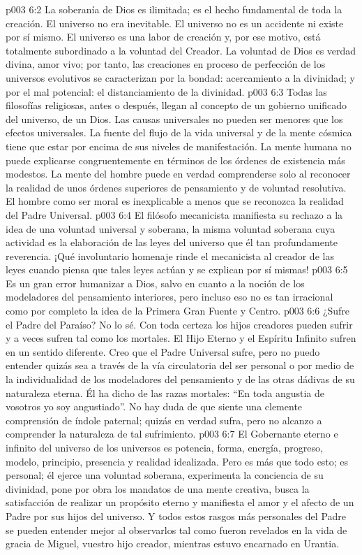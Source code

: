 \vs p003 6:2 La soberanía de Dios es ilimitada; es el hecho fundamental de toda la creación. El universo no era inevitable. El universo no es un accidente ni existe por sí mismo. El universo es una labor de creación y, por ese motivo, está totalmente subordinado a la voluntad del Creador. La voluntad de Dios es verdad divina, amor vivo; por tanto, las creaciones en proceso de perfección de los universos evolutivos se caracterizan por la bondad: acercamiento a la divinidad; y por el mal potencial: el distanciamiento de la divinidad.
\vs p003 6:3 \pc Todas las filosofías religiosas, antes o después, llegan al concepto de un gobierno unificado del universo, de un Dios. Las causas universales no pueden ser menores que los efectos universales. La fuente del flujo de la vida universal y de la mente cósmica tiene que estar por encima de sus niveles de manifestación. La mente humana no puede explicarse congruentemente en términos de los órdenes de existencia más modestos. La mente del hombre puede en verdad comprenderse solo al reconocer la realidad de unos órdenes superiores de pensamiento y de voluntad resolutiva. El hombre como ser moral es inexplicable a menos que se reconozca la realidad del Padre Universal.
\vs p003 6:4 El filósofo mecanicista manifiesta su rechazo a la idea de una voluntad universal y soberana, la misma voluntad soberana cuya actividad es la elaboración de las leyes del universo que él tan profundamente reverencia. ¡Qué involuntario homenaje rinde el mecanicista al creador de las leyes cuando piensa que tales leyes actúan y se explican por sí mismas!
\vs p003 6:5 Es un gran error humanizar a Dios, salvo en cuanto a la noción de los modeladores del pensamiento interiores, pero incluso eso no es tan irracional como  por completo la idea de la Primera Gran Fuente y Centro.
\vs p003 6:6 \pc ¿Sufre el Padre del Paraíso? No lo sé. Con toda certeza los hijos creadores pueden sufrir y a veces sufren tal como los mortales. El Hijo Eterno y el Espíritu Infinito sufren en un sentido diferente. Creo que el Padre Universal sufre, pero no puedo entender  quizás sea a través de la vía circulatoria del ser personal o por medio de la individualidad de los modeladores del pensamiento y de las otras dádivas de su naturaleza eterna. Él ha dicho de las razas mortales: “En toda angustia de vosotros yo soy angustiado”. No hay duda de que siente una clemente comprensión de índole paternal; quizás en verdad sufra, pero no alcanzo a comprender la naturaleza de tal sufrimiento.
\vs p003 6:7 \pc El Gobernante eterno e infinito del universo de los universos es potencia, forma, energía, progreso, modelo, principio, presencia y realidad idealizada. Pero es más que todo esto; es personal; él ejerce una voluntad soberana, experimenta la conciencia de su divinidad, pone por obra los mandatos de una mente creativa, busca la satisfacción de realizar un propósito eterno y manifiesta el amor y el afecto de un Padre por sus hijos del universo. Y todos estos rasgos más personales del Padre se pueden entender mejor al observarlos tal como fueron revelados en la vida de gracia de Miguel, vuestro hijo creador, mientras estuvo encarnado en Urantia.
